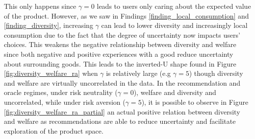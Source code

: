 \documentclass[sigconf, anonymous, review]{acmart}
\begin{document}
This only happens since $\gamma = 0$ leads to users only caring about the expected value of the product. However, as we saw in Findings \ref{finding_local_consumption} and \ref{finding_diversity}, increasing $\gamma$ can lead to lower diversity and increasingly local consumption due to the fact that the degree of uncertainty now impacts users' choices. This weakens the negative relationship between diversity and welfare since both negative and positive experiences with a good reduce uncertainty about surrounding goods. This leads to the inverted-U shape found in Figure \ref{fig:diversity_welfare_ra} when $\gamma$ is relatively large (e.g $\gamma = 5$) though diversity and welfare are virtually uncorrelated in the data. In the recommendation and oracle regimes, under risk neutrality ($\gamma=0$), welfare and diversity and uncorrelated, while under risk aversion ($\gamma=5$), it is possible to observe in Figure \ref{fig:diversity_welfare_ra_partial} an actual positive relation between diversity and welfare as recommendations are able to reduce uncertainty and facilitate exploration of the product space.
\par
\end{document}
